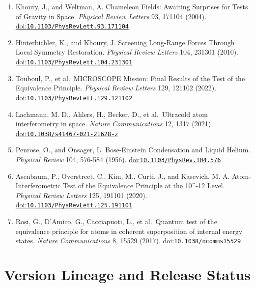 \documentclass[
  american,
  11pt,
  letterpaper,
]{article}
\providecommand{\tightlist}{%
  \setlength{\itemsep}{0pt}\setlength{\parskip}{0pt}}
\begin{document}
\begin{enumerate}
\def\labelenumi{\arabic{enumi}.}
\tightlist
\item
  Khoury, J., and Weltman, A. Chameleon Fields: Awaiting Surprises for Tests of Gravity in Space. \emph{Physical Review Letters} 93, 171104 (2004). \href{https://doi.org/10.1103/PhysRevLett.93.171104}{doi:\nolinkurl{10.1103/PhysRevLett.93.171104}}
\item
  Hinterbichler, K., and Khoury, J. Screening Long-Range Forces Through Local Symmetry Restoration. \emph{Physical Review Letters} 104, 231301 (2010). \href{https://doi.org/10.1103/PhysRevLett.104.231301}{doi:\nolinkurl{10.1103/PhysRevLett.104.231301}}
\item
  Touboul, P., et al.~MICROSCOPE Mission: Final Results of the Test of the Equivalence Principle. \emph{Physical Review Letters} 129, 121102 (2022). \href{https://doi.org/10.1103/PhysRevLett.129.121102}{doi:\nolinkurl{10.1103/PhysRevLett.129.121102}}
\item
  Lachmann, M. D., Ahlers, H., Becker, D., et al.~Ultracold atom interferometry in space. \emph{Nature Communications} 12, 1317 (2021). \href{https://doi.org/10.1038/s41467-021-21628-z}{doi:\nolinkurl{10.1038/s41467-021-21628-z}}
\item
  Penrose, O., and Onsager, L. Bose-Einstein Condensation and Liquid Helium. \emph{Physical Review} 104, 576-584 (1956). \href{https://doi.org/10.1103/PhysRev.104.576}{doi:\nolinkurl{10.1103/PhysRev.104.576}}
\item
  Asenbaum, P., Overstreet, C., Kim, M., Curti, J., and Kasevich, M. A. Atom-Interferometric Test of the Equivalence Principle at the 10\^{}-12 Level. \emph{Physical Review Letters} 125, 191101 (2020). \href{https://doi.org/10.1103/PhysRevLett.125.191101}{doi:\nolinkurl{10.1103/PhysRevLett.125.191101}}
\item
  Rosi, G., D'Amico, G., Cacciapuoti, L., et al.~Quantum test of the equivalence principle for atoms in coherent superposition of internal energy states. \emph{Nature Communications} 8, 15529 (2017). \href{https://doi.org/10.1038/ncomms15529}{doi:\nolinkurl{10.1038/ncomms15529}}
\end{enumerate}

\section{Version Lineage and Release Status}\label{version-lineage-and-release-status}
\end{document}
